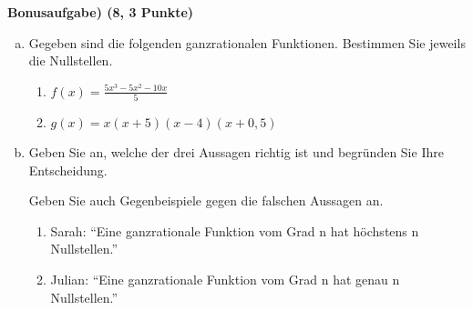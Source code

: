 \documentclass[a4paper,11pt, headsepline,headinclude]{scrreprt}
\newcommand{\AufgabeNr}[2]{%
            \vspace{5mm} \textbf{#1 \hfill (#2 Punkte)} }
\begin{document}
\AufgabeNr{Bonusaufgabe)}{8, 3}
\begin{enumerate}[a)]
 \item Gegeben sind die folgenden ganzrationalen Funktionen. Bestimmen Sie jeweils die Nullstellen.
  \begin{enumerate}[1.]
   \item $f(x)= \frac{5x^3-5x^2-10x}{5}$
   \item $g(x)= x(x+5)(x-4)(x+0,5)$
  \end{enumerate}
 \item Geben Sie an, welche der drei Aussagen richtig ist und begründen Sie Ihre Entscheidung.

Geben Sie auch Gegenbeispiele gegen die falschen Aussagen an.
 \begin{enumerate}[1.]
  \item Sarah:  \enquote{Eine ganzrationale Funktion vom Grad n hat höchstens n Nullstellen.}
  \item Julian: \enquote{Eine ganzrationale Funktion vom Grad n hat genau n Nullstellen.}
 \end{enumerate}

\end{enumerate}



{}
\end{document}
